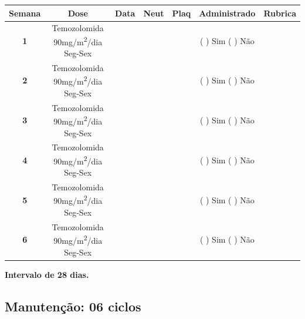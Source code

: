 \documentclass[11pt,a4paper,oldfontcommands]{memoir}
\begin{document}
\renewcommand{\arraystretch}{1.5}

\begin{center}
\begin{table}[H]
\begin{tabular}{p{1cm}c|c|c|c|c|c}
	\hline
\multicolumn{1}{c|}{\multirow{1}{*}{\textbf{Semana}}}&{Dose}&{Data}&{Neut}&{Plaq}&{Administrado}&{Rubrica} \\
    \hline
    \multicolumn{1}{c|}{\multirow{1}{*}{\textbf{1}}}&{Temozolomida 90mg/m\textsuperscript{2}/dia Seg-Sex}&{}&&&{(  ) Sim (  ) Não}&\\
    \cline{3-5}
    \multicolumn{1}{c|}{\multirow{1}{*}{{\textbf{2}}}}&{Temozolomida 90mg/m\textsuperscript{2}/dia Seg-Sex}&{}&&&{(  ) Sim (  ) Não}&\\
    \cline{3-5}
    \multicolumn{1}{c|}{\multirow{1}{*}{{\textbf{3}}}}&{Temozolomida 90mg/m\textsuperscript{2}/dia Seg-Sex}&{}&&&{(  ) Sim (  ) Não}&\\
    \cline{3-5}
    \multicolumn{1}{c|}{\multirow{1}{*}{{\textbf{4}}}}&{Temozolomida 90mg/m\textsuperscript{2}/dia Seg-Sex}&{}&&&{(  ) Sim (  ) Não}&\\
    \cline{3-5}
    \multicolumn{1}{c|}{\multirow{1}{*}{{\textbf{5}}}}&{Temozolomida 90mg/m\textsuperscript{2}/dia Seg-Sex}&{}&&&{(  ) Sim (  ) Não}&\\
    \cline{3-5}
    \multicolumn{1}{c|}{\multirow{1}{*}{{\textbf{6}}}}&{Temozolomida 90mg/m\textsuperscript{2}/dia Seg-Sex}&{}&&&{(  ) Sim (  ) Não}&\\
    \hline
\end{tabular}
\end{table}
\textbf{Intervalo de 28 dias.}
\end{center}
\pagebreak
\subsection{Manutenção: 06 ciclos}
\end{document}
